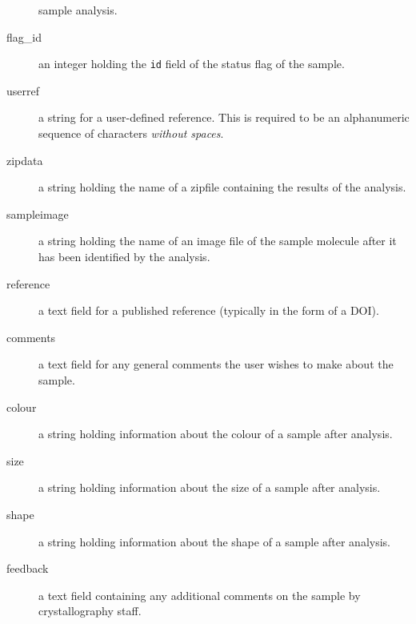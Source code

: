 \documentclass[12pt,twoside]{article}
\begin{document}
\begin{description}
sample analysis.
\item[flag\_id]
an integer holding the \verb=id= field of the status flag of the sample.
\item[userref]
a string for a user-defined reference. This is required to be an
alphanumeric sequence of characters \emph{without spaces}.
\item[zipdata]
a string holding the name of a zipfile containing the results of the analysis.
\item[sampleimage]
a string holding the name of an image file of the sample molecule after it
has been identified by the analysis.
\item[reference]
a text field for a published reference (typically in the form of a DOI).
\item[comments]
a text field for any general comments the user wishes to make about the sample.
\item[colour]
a string holding information about the colour of a sample after analysis.
\item[size]
a string holding information about the size of a sample after analysis.
\item[shape]
a string holding information about the shape of a sample after analysis.
\item[feedback]
a text field containing any additional comments on the sample by
crystallography staff.
\end{description}
\end{document}
